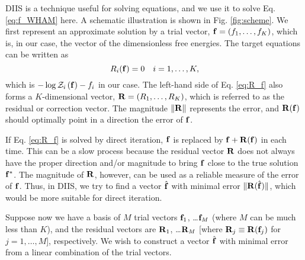 \documentclass[reprint,aip,jcp,superscriptaddress]{revtex4-1}
\begin{document}
DIIS is a technique useful for solving equations\cite{
pulay1980, *pulay1982, *hamilton1986,
kovalenko1999, howard2011},
and we use it
to solve Eq. \eqref{eq:f_WHAM} here.
%
A schematic illustration
is shown in Fig. \ref{fig:scheme}.
%
We first represent an approximate solution
by a trial vector,
$\mathbf{f} = (f_1, \dots, f_K)$,
which is, in our case, the vector of
the dimensionless free energies.
%
The target equations can be written as
%
\begin{equation}
  R_i(\mathbf{f}) = 0  \quad i = 1, \ldots, K,
  \label{eq:R_f}
\end{equation}
%
which is
$-\log \mathcal{Z}_i\left( \mathbf{f} \right) - f_i$
in our case.
%
The left-hand side of Eq. \eqref{eq:R_f}
also forms a $K$-dimensional vector,
$\mathbf{R} = (R_1, \dots, R_K)$,
which is referred to as the residual or correction vector.
%
The magnitude
$\| \mathbf{R} \|$
represents the error,
%
and
$\mathbf{R}(\mathbf{f})$
should optimally point in a direction
 the error of $\mathbf{f}$.
%



If Eq. \eqref{eq:R_f} is solved
by direct iteration,
$\mathbf{f}$ is replaced by $\mathbf{f} + \mathbf{R}(\mathbf{f})$
in each time.
%
This can be a slow process
because the residual vector $\mathbf{R}$
does not always have
the proper direction and/or magnitude
to bring $\mathbf{f}$
close to the true solution $\mathbf{f}^*$.
%
The magnitude of $\mathbf{R}$, however,
can be used as a reliable measure
of the error of $\mathbf{f}$.
%
Thus, in DIIS, we try to find a vector $\hat{\mathbf{f}}$
with minimal error $\| \mathbf{R}(\hat{\mathbf{f}}) \|$,
which would be more suitable
for direct iteration.



Suppose now we have a basis of $M$ trial vectors
$\mathbf{f}_1$, \dots $\mathbf{f}_M$
(where $M$ can be much less than $K$),
%
and the residual vectors are
$\mathbf{R}_1$, \dots $\mathbf{R}_M$
[where $\mathbf{R}_j \equiv \mathbf{R}(\mathbf{f}_j)$
for $j = 1, \dots, M$],
respectively.
%
We wish to construct a vector $\hat{\mathbf{f}}$
with minimal error
from a linear combination of the trial vectors.
\end{document}
